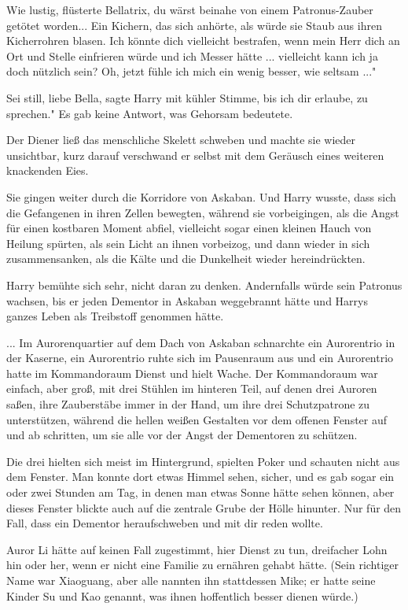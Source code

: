 \glqq Wie lustig\grqq{}, flüsterte Bellatrix, \glqq du wärst beinahe von einem
Patronus-Zauber getötet worden...\grqq{} Ein Kichern, das sich anhörte, als
würde sie Staub aus ihren Kicherrohren blasen. \glqq Ich könnte dich vielleicht
bestrafen, wenn mein Herr dich an Ort und Stelle einfrieren würde und ich Messer
hätte ... vielleicht kann ich ja doch nützlich sein? Oh, jetzt fühle ich mich
ein wenig besser, wie seltsam ..."

\glqq Sei still, liebe Bella\grqq{}, sagte Harry mit kühler Stimme, \glqq bis
ich dir erlaube, zu sprechen." Es gab keine Antwort, was Gehorsam bedeutete.

Der Diener ließ das menschliche Skelett schweben und machte sie wieder
unsichtbar, kurz darauf verschwand er selbst mit dem Geräusch eines weiteren
knackenden Eies.

Sie gingen weiter durch die Korridore von Askaban. Und Harry wusste, dass sich
die Gefangenen in ihren Zellen bewegten, während sie vorbeigingen, als die Angst
für einen kostbaren Moment abfiel, vielleicht sogar einen kleinen Hauch von
Heilung spürten, als sein Licht an ihnen vorbeizog, und dann wieder in sich
zusammensanken, als die Kälte und die Dunkelheit wieder hereindrückten.

Harry bemühte sich sehr, nicht daran zu denken. Andernfalls würde sein Patronus
wachsen, bis er jeden Dementor in Askaban weggebrannt hätte und Harrys ganzes
Leben als Treibstoff genommen hätte.

... Im Aurorenquartier auf dem Dach von Askaban schnarchte ein Aurorentrio in
der Kaserne, ein Aurorentrio ruhte sich im Pausenraum aus und ein Aurorentrio
hatte im Kommandoraum Dienst und hielt Wache. Der Kommandoraum war einfach, aber
groß, mit drei Stühlen im hinteren Teil, auf denen drei Auroren saßen, ihre
Zauberstäbe immer in der Hand, um ihre drei Schutzpatrone zu unterstützen,
während die hellen weißen Gestalten vor dem offenen Fenster auf und ab
schritten, um sie alle vor der Angst der Dementoren zu schützen.

Die drei hielten sich meist im Hintergrund, spielten Poker und schauten nicht
aus dem Fenster. Man konnte dort etwas Himmel sehen, sicher, und es gab sogar
ein oder zwei Stunden am Tag, in denen man etwas Sonne hätte sehen können, aber
dieses Fenster blickte auch auf die zentrale Grube der Hölle hinunter. Nur für
den Fall, dass ein Dementor heraufschweben und mit dir reden wollte.

Auror Li hätte auf keinen Fall zugestimmt, hier Dienst zu tun, dreifacher Lohn
hin oder her, wenn er nicht eine Familie zu ernähren gehabt hätte. (Sein
richtiger Name war Xiaoguang, aber alle nannten ihn stattdessen Mike; er hatte
seine Kinder Su und Kao genannt, was ihnen hoffentlich besser dienen würde.)

